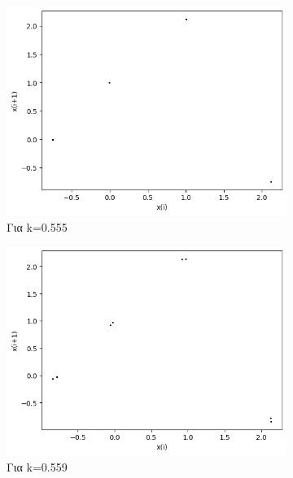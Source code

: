 \begin{figure}[h!]
\begin{subfigure}[c]{0.4\textwidth}
		\includegraphics[width=\textwidth]{LateX images/graphs/k0555}
		\caption{Για k=0.555}
		\label{f:k10}
	\end{subfigure}
	\hfill
	\begin{subfigure}[c]{0.4\textwidth}
		\centering
		\includegraphics[width=\textwidth]{LateX images/graphs/k0559}
		\caption{Για k=0.559}
		\label{f:k11}
	\end{subfigure}
	\hfill
	\begin{subfigure}[c]{0.4\textwidth}
		\centering

\end{subfigure}
\end{figure}
